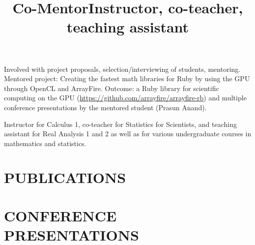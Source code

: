 \documentclass[overlapped, line, 10pt]{res} %
\begin{document}
\begin{resume}
\title{Co-Mentor}
\begin{position}
  Involved with project proposals, selection/interviewing of students, mentoring. Mentored project: Creating the fastest math libraries for Ruby by using the GPU through OpenCL and ArrayFire. Outcome: a Ruby library for scientific computing on the GPU (\url{https://github.com/arrayfire/arrayfire-rb}) and multiple conference presentations by the mentored student (Prasun Anand).
\end{position}

\title{Instructor, co-teacher, teaching assistant}
\begin{position}
  Instructor for Calculus 1, co-teacher for Statistics for Scientists, and teaching assistant for Real Analysis 1 and 2 as well as for various undergraduate courses in mathematics and statistics.
\end{position}


\section{PUBLICATIONS}





\section{CONFERENCE PRESENTATIONS}


\end{resume}
\end{document}
